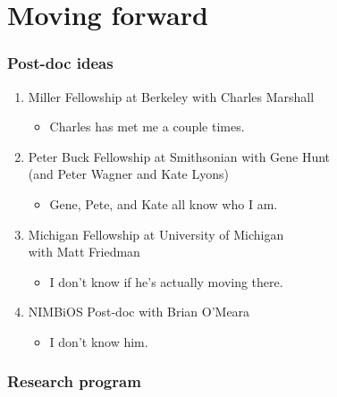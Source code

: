 \documentclass{beamer}
\begin{document}
\section{Moving forward}

\begin{frame}
  \frametitle{Post-doc ideas}
  \begin{enumerate}
    \item Miller Fellowship at Berkeley with Charles Marshall
      \begin{itemize}
        \item Charles has met me a couple times.
      \end{itemize}
    \item Peter Buck Fellowship at Smithsonian with Gene Hunt \\(and Peter Wagner and Kate Lyons)
      \begin{itemize}
        \item Gene, Pete, and Kate all know who I am.
      \end{itemize}
    \item Michigan Fellowship at University of Michigan \\with Matt Friedman
      \begin{itemize}
        \item I don't know if he's actually moving there.
      \end{itemize}
    \item NIMBiOS Post-doc with Brian O'Meara
      \begin{itemize}
        \item I don't know him.
      \end{itemize}
  \end{enumerate}
\end{frame}

\begin{frame}
  \frametitle{Research program}
\end{frame}
\end{document}
